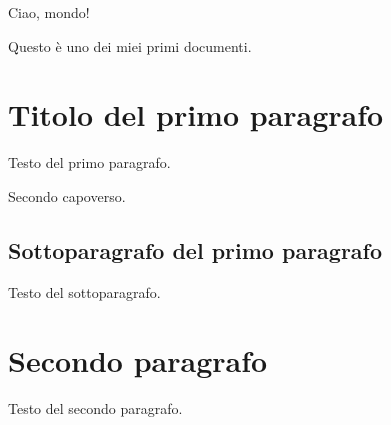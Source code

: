 \documentclass{article}
\begin{document}
Ciao, mondo!

Questo è uno dei miei primi documenti.

\section{Titolo del primo paragrafo}

Testo del primo paragrafo.

Secondo capoverso.

\subsection{Sottoparagrafo del primo paragrafo}

Testo del sottoparagrafo.

\section{Secondo paragrafo}

Testo del secondo paragrafo.
\end{document}
